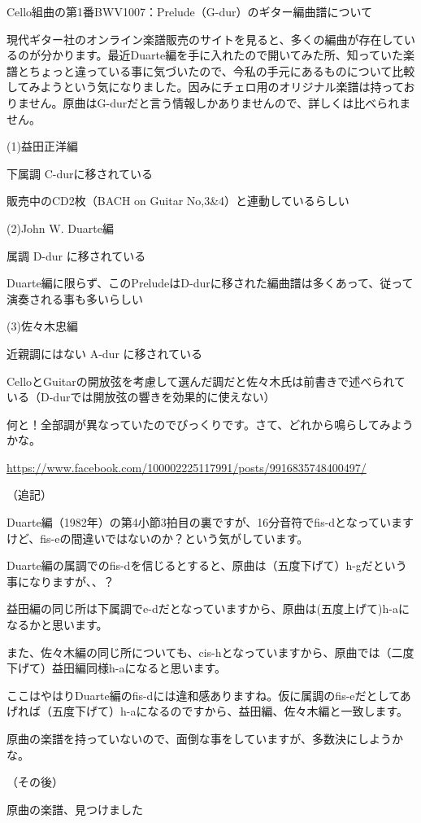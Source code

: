 \documentclass[facebook_diary.tex]{subfiles}
\begin{document}
Cello組曲の第1番BWV1007：Prelude（G-dur）のギター編曲譜について


現代ギター社のオンライン楽譜販売のサイトを見ると、多くの編曲が存在しているのが分かります。最近Duarte編を手に入れたので開いてみた所、知っていた楽譜とちょっと違っている事に気づいたので、今私の手元にあるものについて比較してみようという気になりました。因みにチェロ用のオリジナル楽譜は持っておりません。原曲はG-durだと言う情報しかありませんので、詳しくは比べられません。


(1)益田正洋編

下属調 C-durに移されている

販売中のCD2枚（BACH on Guitar No,3\&4）と連動しているらしい


(2)John W. Duarte編

属調 D-dur に移されている

Duarte編に限らず、このPreludeはD-durに移された編曲譜は多くあって、従って演奏される事も多いらしい


(3)佐々木忠編

近親調にはない A-dur に移されている

CelloとGuitarの開放弦を考慮して選んだ調だと佐々木氏は前書きで述べられている（D-durでは開放弦の響きを効果的に使えない）


何と！全部調が異なっていたのでびっくりです。さて、どれから鳴らしてみようかな。


\url{https://www.facebook.com/100002225117991/posts/9916835748400497/}




（追記）

Duarte編（1982年）の第4小節3拍目の裏ですが、16分音符でfis-dとなっていますけど、fis-eの間違いではないのか？という気がしています。

Duarte編の属調でのfis-dを信じるとすると、原曲は（五度下げて）h-gだという事になりますが、、？

益田編の同じ所は下属調でe-dだとなっていますから、原曲は(五度上げて)h-aになるかと思います。

また、佐々木編の同じ所についても、cis-hとなっていますから、原曲では（二度下げて）益田編同様h-aになると思います。

ここはやはりDuarte編のfis-dには違和感ありますね。仮に属調のfis-eだとしてあげれば（五度下げて）h-aになるのですから、益田編、佐々木編と一致します。

原曲の楽譜を持っていないので、面倒な事をしていますが、多数決にしようかな。


（その後）

原曲の楽譜、見つけました
\end{document}
